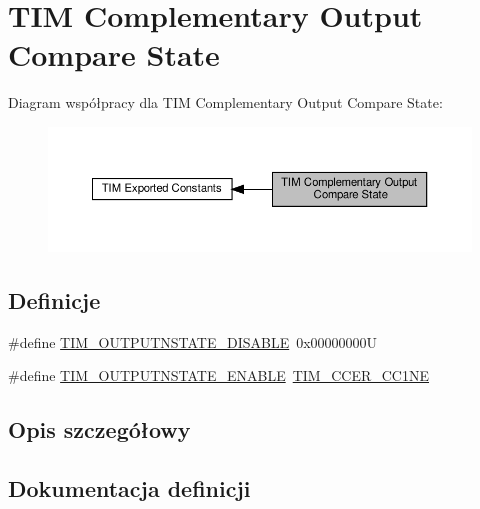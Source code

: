 \hypertarget{group___t_i_m___output___compare___n___state}{}\section{T\+IM Complementary Output Compare State}
\label{group___t_i_m___output___compare___n___state}
Diagram współpracy dla T\+IM Complementary Output Compare State\+:\nopagebreak
\begin{figure}[H]
\begin{center}
\leavevmode
\includegraphics[width=350pt]{group___t_i_m___output___compare___n___state}
\end{center}
\end{figure}
\subsection*{Definicje}
\begin{DoxyCompactItemize}
\item 
\#define \hyperlink{group___t_i_m___output___compare___n___state_ga07bb7288fc4ed155301a3276908a23a0}{T\+I\+M\+\_\+\+O\+U\+T\+P\+U\+T\+N\+S\+T\+A\+T\+E\+\_\+\+D\+I\+S\+A\+B\+LE}~0x00000000U
\item 
\#define \hyperlink{group___t_i_m___output___compare___n___state_ga3323d8c81a7f3940aa290d160dea3e0d}{T\+I\+M\+\_\+\+O\+U\+T\+P\+U\+T\+N\+S\+T\+A\+T\+E\+\_\+\+E\+N\+A\+B\+LE}~\hyperlink{group___peripheral___registers___bits___definition_ga813056b3f90a13c4432aeba55f28957e}{T\+I\+M\+\_\+\+C\+C\+E\+R\+\_\+\+C\+C1\+NE}
\end{DoxyCompactItemize}


\subsection{Opis szczegółowy}


\subsection{Dokumentacja definicji}
\mbox{\label{group___t_i_m___output___compare___n___state_ga07bb7288fc4ed155301a3276908a23a0}} 
